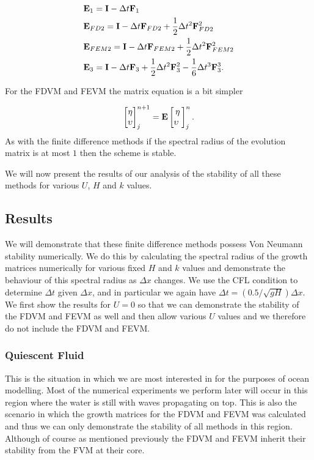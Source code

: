 \begin{align*}
&\mathbf{E}_{1} = \mathbf{I} - \Delta t \mathbf{F}_1 \\
&\mathbf{E}_{FD2} = \mathbf{I} - \Delta t \mathbf{F}_{FD2} + \frac{1}{2} \Delta t^2 \mathbf{F}_{FD2}^2 \\
&\mathbf{E}_{FEM2} =  \mathbf{I} - \Delta t \mathbf{F}_{FEM2} + \frac{1}{2} \Delta t^2 \mathbf{F}_{FEM2}^2\\
&\mathbf{E}_{3} = \mathbf{I} - \Delta t \mathbf{F}_{3} + \frac{1}{2} \Delta t^2 \mathbf{F}_3^2 - \frac{1}{6} \Delta t^3 \mathbf{F}_3^3. \\
\end{align*}

For the FDVM and FEVM the matrix equation is a bit simpler

\begin{equation}
\begin{bmatrix}
\eta \\
\upsilon\\
\end{bmatrix}^{n+1}_j = \mathbf{E}  \begin{bmatrix}
\eta\\
\upsilon\
\end{bmatrix}^{n}_j .
\end{equation}
As with the finite difference methods if the spectral radius of the evolution matrix is at most $1$ then the scheme is stable.

We will now present the results of our analysis of the stability of all these methods for various $U$, $H$ and $k$ values. 

\subsection{Results}
We will demonstrate that these finite difference methods possess Von Neumann stability numerically. We do this by calculating the spectral radius of the growth matrices numerically for various fixed $H$ and $k$ values and demonstrate the behaviour of this spectral radius as $\Delta x$ changes. We use the CFL condition to determine $\Delta t$ given $\Delta x$, and in particular we again have $\Delta t =   \left( 0.5 / \sqrt{gH} \right) {\Delta x} $. We first show the results for $U = 0$ so that we  can demonstrate the stability of the FDVM and FEVM as well and then allow various $U$ values and we therefore do not include the FDVM and FEVM.

\subsubsection{Quiescent Fluid}
This is the situation in which we are most interested in for the purposes of ocean modelling. Most of the numerical experiments we perform later will occur in this region where the water is still with waves propagating on top. This is also the scenario in which the growth matrices for the FDVM and FEVM was calculated and thus we can only demonstrate the stability of all methods in this region. Although of course as mentioned previously the FDVM and FEVM inherit their stability from the FVM at their core.

